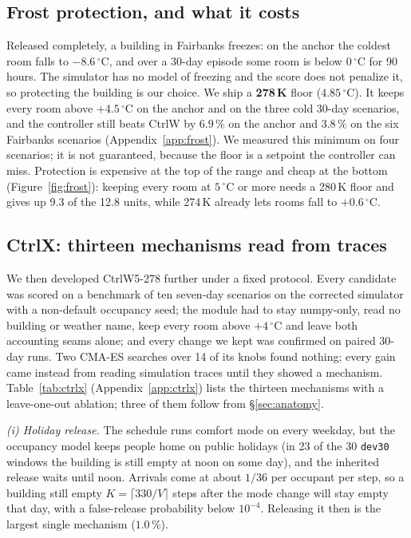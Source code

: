 \documentclass{article}
\newcommand{\cn}[1]{\texttt{#1}}
\begin{document}
\subsection{Frost protection, and what it costs}
\label{sec:frost}

Released completely, a building in Fairbanks freezes: on the anchor the coldest room falls to
$-8.6\,^\circ$C, and over a 30-day episode some room is below $0\,^\circ$C for 90 hours. The
simulator has no model of freezing and the score does not penalize it, so protecting the
building is our choice. We ship a \textbf{278\,K} floor ($4.85\,^\circ$C). It keeps every room
above $+4.5\,^\circ$C on the anchor and on the three cold 30-day scenarios, and the controller
still beats CtrlW by $6.9\,\%$ on the anchor and $3.8\,\%$ on the six Fairbanks scenarios
(Appendix~\ref{app:frost}). We measured this minimum on four scenarios; it is not guaranteed,
because the floor is a setpoint the controller can miss. Protection is expensive at the top of
the range and cheap at the bottom (Figure~\ref{fig:frost}): keeping every room at $5\,^\circ$C
or more needs a 280\,K floor and gives up 9.3 of the 12.8 units, while 274\,K already lets
rooms fall to $+0.6\,^\circ$C.

\subsection{CtrlX: thirteen mechanisms read from traces}
\label{sec:ctrlx}

We then developed CtrlW5-278 further under a fixed protocol. Every candidate was scored on a
benchmark of ten seven-day scenarios on the corrected simulator with a non-default occupancy
seed; the module had to stay numpy-only, read no building or weather name, keep every room above
$+4\,^\circ$C and leave both accounting seams alone; and every change we kept was confirmed on
paired 30-day runs. Two CMA-ES searches over 14 of its knobs found nothing; every gain came
instead from reading simulation traces until they showed a mechanism. Table~\ref{tab:ctrlx}
(Appendix~\ref{app:ctrlx}) lists the thirteen mechanisms with a leave-one-out ablation; three of
them follow from \S\ref{sec:anatomy}.

\emph{(i) Holiday release.} The schedule runs comfort mode on every weekday, but the occupancy
model keeps people home on public holidays (in 23 of the 30 \cn{dev30} windows the building is
still empty at noon on some day), and the inherited release waits until noon. Arrivals come at
about $1/36$ per occupant per step, so a building still empty $K=\lceil330/V\rceil$ steps after
the mode change will stay empty that day, with a false-release probability below $10^{-4}$.
Releasing it then is the largest single mechanism ($1.0\,\%$).
\end{document}
